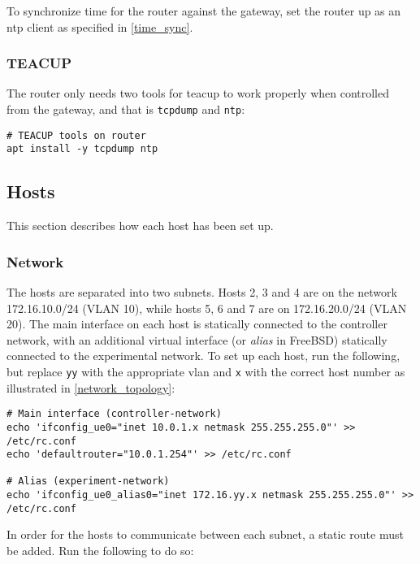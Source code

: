 To synchronize time for the router against the gateway, set the router up as an \gls{ntp} client as specified in \ref{time_sync}.


\subsubsection{TEACUP}

The router only needs two tools for \gls{teacup} to work properly when controlled from the gateway, and that is \lstinline{tcpdump} and \lstinline{ntp}:

\begin{verbatim}
# TEACUP tools on router
apt install -y tcpdump ntp
\end{verbatim}



\subsection{Hosts}

This section describes how each host has been set up. 


\subsubsection{Network}

The hosts are separated into two subnets. Hosts 2, 3 and 4 are on the network 172.16.10.0/24 (VLAN 10), while hosts 5, 6 and 7 are on 172.16.20.0/24 (VLAN 20). The main interface on each host is statically connected to the controller network, with an additional virtual interface (or \textit{alias} in FreeBSD) statically connected to the experimental network. To set up each host, run the following, but replace \lstinline{yy} with the appropriate \gls{vlan} and \lstinline{x} with the correct host number as illustrated in \ref{network_topology}:

\begin{verbatim}
# Main interface (controller-network)
echo 'ifconfig_ue0="inet 10.0.1.x netmask 255.255.255.0"' >> /etc/rc.conf
echo 'defaultrouter="10.0.1.254"' >> /etc/rc.conf

# Alias (experiment-network)
echo 'ifconfig_ue0_alias0="inet 172.16.yy.x netmask 255.255.255.0"' >> /etc/rc.conf
\end{verbatim}

In order for the hosts to communicate between each subnet, a static route must be added. Run the following to do so:

